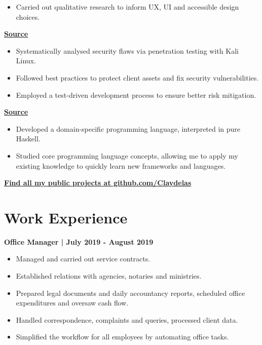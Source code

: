 \documentclass[]{resume}
\begin{document}
\begin{minipage}[t]{0.64\textwidth}
\begin{flatitems}
\begin{itemize}[leftmargin=*]
        \item Carried out qualitative research to inform UX, UI and accessible design choices.
    \end{itemize}
\item[] \hfill \href{https://github.com/Claydelas/web-sec}{\bf Source}
    \begin{itemize}[leftmargin=*]
        \item Systematically analysed security flaws via penetration testing with Kali Linux.
        \item Followed best practices to protect client assets and fix security vulnerabilities.
        \item Employed a test-driven development process to ensure better risk mitigation.
    \end{itemize}
\item[] \hfill \href{https://github.com/Claydelas/streamless}{\bf Source}
    \begin{itemize}[leftmargin=*]
        \item Developed a domain-specific programming language, interpreted in pure Haskell.
        \item Studied core programming language concepts, allowing me to apply my existing knowledge to quickly learn new frameworks and languages.
    \end{itemize}
\end{flatitems}
\sectionsep
\hfill \href{https://github.com/Claydelas}{\bf Find all my public projects at github.com/Claydelas}
\section{Work Experience}
\vspace{\topsep}
\begin{flatitems}
\item[] \hfill {\bf Office Manager | July 2019 - August 2019}
    \begin{itemize}[leftmargin=*]
        \item Managed and carried out service contracts.
        \item Established relations with agencies, notaries and ministries.
        \item Prepared legal documents and daily accountancy reports, scheduled office\\ expenditures and oversaw cash flow.
        \item Handled correspondence, complaints and queries, processed client data.%
        \item Simplified the workflow for all employees by automating office tasks.
    \end{itemize}
\end{flatitems}
\end{minipage} 
\end{document}
